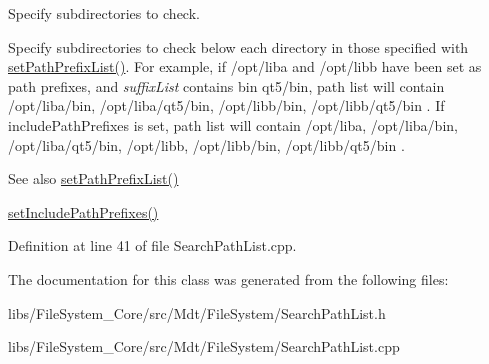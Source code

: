 Specify subdirectories to check. 

Specify subdirectories to check below each directory in those specified with \hyperlink{class_mdt_1_1_file_system_1_1_search_path_list_aa8980672ad2de4ec510276ae517b99c7}{set\+Path\+Prefix\+List()}. For example, if /opt/liba and /opt/libb have been set as path prefixes, and {\itshape suffix\+List} contains bin qt5/bin, path list will contain /opt/liba/bin, /opt/liba/qt5/bin, /opt/libb/bin, /opt/libb/qt5/bin . If include\+Path\+Prefixes is set, path list will contain /opt/liba, /opt/liba/bin, /opt/liba/qt5/bin, /opt/libb, /opt/libb/bin, /opt/libb/qt5/bin .

\begin{DoxySeeAlso}{See also}
\hyperlink{class_mdt_1_1_file_system_1_1_search_path_list_aa8980672ad2de4ec510276ae517b99c7}{set\+Path\+Prefix\+List()} 

\hyperlink{class_mdt_1_1_file_system_1_1_search_path_list_ada890c31acde466a0adb741158c00046}{set\+Include\+Path\+Prefixes()} 
\end{DoxySeeAlso}


Definition at line 41 of file Search\+Path\+List.\+cpp.



The documentation for this class was generated from the following files\+:\begin{DoxyCompactItemize}
\item 
libs/\+File\+System\+\_\+\+Core/src/\+Mdt/\+File\+System/Search\+Path\+List.\+h\item 
libs/\+File\+System\+\_\+\+Core/src/\+Mdt/\+File\+System/Search\+Path\+List.\+cpp\end{DoxyCompactItemize}
